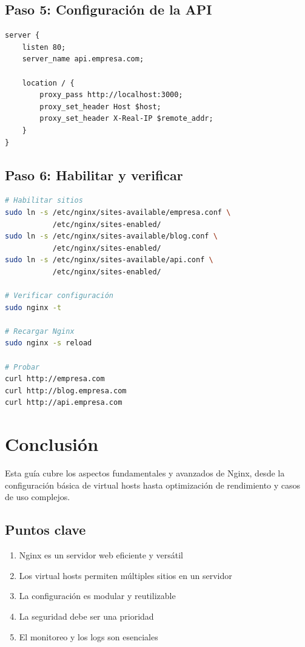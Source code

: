 \documentclass[11pt,a4paper]{article}
\begin{document}
\subsection{Paso 5: Configuración de la API}

\begin{lstlisting}[caption=/etc/nginx/sites-available/api.conf]
server {
    listen 80;
    server_name api.empresa.com;
    
    location / {
        proxy_pass http://localhost:3000;
        proxy_set_header Host $host;
        proxy_set_header X-Real-IP $remote_addr;
    }
}
\end{lstlisting}

\subsection{Paso 6: Habilitar y verificar}

\begin{lstlisting}[language=bash]
# Habilitar sitios
sudo ln -s /etc/nginx/sites-available/empresa.conf \
           /etc/nginx/sites-enabled/
sudo ln -s /etc/nginx/sites-available/blog.conf \
           /etc/nginx/sites-enabled/
sudo ln -s /etc/nginx/sites-available/api.conf \
           /etc/nginx/sites-enabled/

# Verificar configuración
sudo nginx -t

# Recargar Nginx
sudo nginx -s reload

# Probar
curl http://empresa.com
curl http://blog.empresa.com
curl http://api.empresa.com
\end{lstlisting}

\section{Conclusión}

Esta guía cubre los aspectos fundamentales y avanzados de Nginx, desde la configuración básica de virtual hosts hasta optimización de rendimiento y casos de uso complejos.

\subsection{Puntos clave}

\begin{enumerate}
    \item Nginx es un servidor web eficiente y versátil
    \item Los virtual hosts permiten múltiples sitios en un servidor
    \item La configuración es modular y reutilizable
    \item La seguridad debe ser una prioridad
    \item El monitoreo y los logs son esenciales
\end{enumerate}
\end{document}
